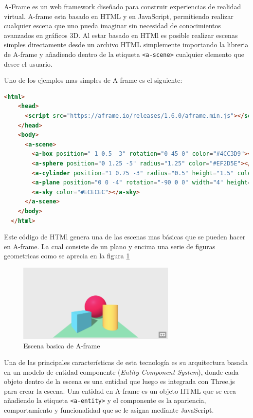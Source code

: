 \documentclass[a4paper, 12pt]{book}
\begin{document}
A-Frame \cite{aframe_docs} es un web framework diseñado para construir experiencias de realidad virtual. A-frame esta basado en HTML y en JavaScript, permitiendo realizar cualquier escena que uno pueda imaginar sin necesidad de conocimientos avanzados en gráficos 3D. 
Al estar basado en HTMl es posible realizar escenas simples directamente desde un archivo HTML simplemente importando la libreria de A-frame y añadiendo dentro de la etiqueta \texttt{<a-scene>} cualquier elemento que desee el usuario.  

Uno de los ejemplos mas simples de A-frame es el siguiente:
\begin{lstlisting}[language=HTML, caption=Escena A-Frame básica, captionpos=b]
  <html>
    <head>
      <script src="https://aframe.io/releases/1.6.0/aframe.min.js"></script>
    </head>
    <body>
      <a-scene>
        <a-box position="-1 0.5 -3" rotation="0 45 0" color="#4CC3D9"></a-box>
        <a-sphere position="0 1.25 -5" radius="1.25" color="#EF2D5E"></a-sphere>
        <a-cylinder position="1 0.75 -3" radius="0.5" height="1.5" color="#FFC65D"></a-cylinder>
        <a-plane position="0 0 -4" rotation="-90 0 0" width="4" height="4" color="#7BC8A4"></a-plane>
        <a-sky color="#ECECEC"></a-sky>
      </a-scene>
    </body>
  </html>
\end{lstlisting}

Este código de HTMl genera una de las escenas mas básicas que se pueden hacer en A-frame. La cual consiste de un plano y encima una serie de figuras geometricas como se aprecia en la figura \ref{fig:aframe-basic}

\begin{figure}
  \centering
  \includegraphics[width=0.7\textwidth]{img/aframe_hello_world.png}
  \caption{Escena basica de A-frame}
  \label{fig:aframe-basic}
\end{figure}

Una de las principales características de esta tecnología es su arquitectura basada en un modelo de entidad-componente (\textit{Entity Component System}), donde cada objeto dentro de la escena es una entidad que luego es integrada con Three.js para crear la escena.
Una entidad en A-frame es un objeto HTML que se crea añadiendo la etiqueta \texttt{<a-entity>} y el componente es la apariencia, comportamiento y funcionalidad que se le asigna mediante JavaScript. 
\end{document}
